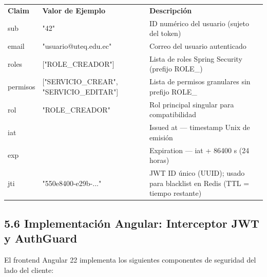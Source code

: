 \documentclass[
]{article}
\begin{document}
\begin{longtable}[]{@{}
  >{\raggedright\arraybackslash}p{}
  >{\raggedright\arraybackslash}p{}
  >{\raggedright\arraybackslash}p{}@{}}
\toprule\noalign{}
\endhead
\bottomrule\noalign{}
\endlastfoot
\textbf{Claim} & \textbf{Valor de Ejemplo} & \textbf{Descripción} \\
sub & "42" & ID numérico del usuario (sujeto del token) \\
email & "usuario@uteq.edu.ec" & Correo del usuario autenticado \\
roles & {[}"ROLE\_CREADOR"{]} & Lista de roles Spring Security (prefijo
ROLE\_) \\
permisos & {[}"SERVICIO\_CREAR", "SERVICIO\_EDITAR"{]} & Lista de
permisos granulares sin prefijo ROLE\_ \\
rol & "ROLE\_CREADOR" & Rol principal singular para compatibilidad \\
iat & 1735689600 & Issued at --- timestamp Unix de emisión \\
exp & 1735776000 & Expiration --- iat + 86400 s (24 horas) \\
jti & "550e8400-e29b-..." & JWT ID único (UUID); usado para blacklist en
Redis (TTL = tiempo restante) \\
\end{longtable}

\subsection{5.6 Implementación Angular: Interceptor JWT y
AuthGuard}

El frontend Angular 22 implementa los siguientes componentes de
seguridad del lado del cliente:
\end{document}
